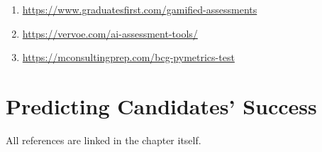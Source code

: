 \documentclass[
]{book}
\providecommand{\tightlist}{%
  \setlength{\itemsep}{0pt}\setlength{\parskip}{0pt}}
\begin{document}
\begin{enumerate}
\def\labelenumi{\arabic{enumi}.}
\tightlist
\item
  \url{https://www.graduatesfirst.com/gamified-assessments}
\item
  \url{https://vervoe.com/ai-assessment-tools/}
\item
  \url{https://mconsultingprep.com/bcg-pymetrics-test}
\end{enumerate}

\hypertarget{predicting-candidates-success-1}{%
\section{Predicting Candidates' Success}\label{predicting-candidates-success-1}}

All references are linked in the chapter itself.

  
\end{document}
